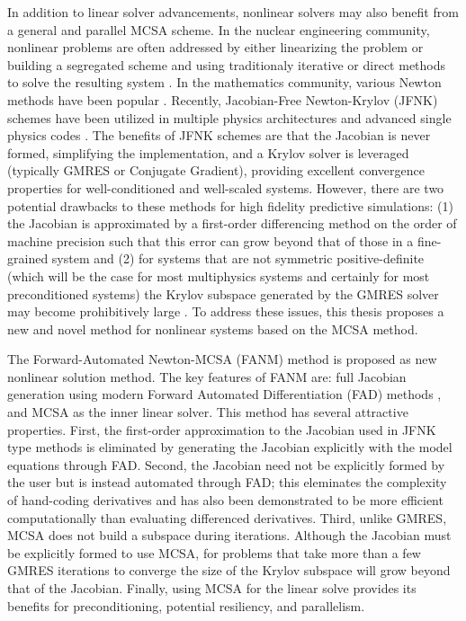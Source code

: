 In addition to linear solver advancements, nonlinear solvers may also
benefit from a general and parallel MCSA scheme. In the nuclear
engineering community, nonlinear problems are often addressed by
either linearizing the problem or building a segregated scheme and
using traditionaly iterative or direct methods to solve the resulting
system \citep{pletcher_computational_1997}. In the mathematics
community, various Newton methods have been popular
\citep{kelley_iterative_1995}. Recently, Jacobian-Free Newton-Krylov
(JFNK) schemes \citep{knoll_jacobian-free_2004} have been utilized in
multiple physics architectures and advanced single physics codes
\citep{gaston_parallel_2009}. The benefits of JFNK schemes are that
the Jacobian is never formed, simplifying the implementation, and a
Krylov solver is leveraged (typically GMRES or Conjugate Gradient),
providing excellent convergence properties for well-conditioned and
well-scaled systems. However, there are two potential drawbacks to
these methods for high fidelity predictive simulations: (1) the
Jacobian is approximated by a first-order differencing method on the
order of machine precision such that this error can grow beyond that
of those in a fine-grained system \citep{kelley_iterative_1995} and
(2) for systems that are not symmetric positive-definite (which will
be the case for most multiphysics systems and certainly for most
preconditioned systems) the Krylov subspace generated by the GMRES
solver may become prohibitively large
\citep{knoll_newton-krylov_1995}. To address these issues, this thesis
proposes a new and novel method for nonlinear systems based on the
MCSA method.

The Forward-Automated Newton-MCSA (FANM) method is proposed as new
nonlinear solution method. The key features of FANM are: full Jacobian
generation using modern Forward Automated Differentiation (FAD)
methods \citep{bartlett_automatic_2006}, and MCSA as the inner linear
solver. This method has several attractive properties. First, the
first-order approximation to the Jacobian used in JFNK type methods is
eliminated by generating the Jacobian explicitly with the model
equations through FAD. Second, the Jacobian need not be explicitly
formed by the user but is instead automated through FAD; this
eleminates the complexity of hand-coding derivatives and has also been
demonstrated to be more efficient computationally than evaluating
differenced derivatives. Third, unlike GMRES, MCSA does not build a
subspace during iterations. Although the Jacobian must be explicitly
formed to use MCSA, for problems that take more than a few GMRES
iterations to converge the size of the Krylov subspace will grow
beyond that of the Jacobian. Finally, using MCSA for the linear solve
provides its benefits for preconditioning, potential resiliency, and
parallelism.

